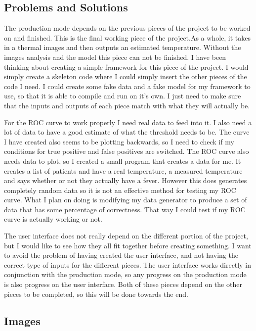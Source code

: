 \documentclass[onecolumn, draftclsnofoot,10pt, compsoc]{IEEEtran}
\begin{document}
\subsection{Problems and Solutions}
The production mode depends on the previous pieces of the project to be worked on and finished. This is the final working piece of the project.As a whole, it takes in a thermal images and then outputs an estimated temperature. Without the images analysis and the model this piece can not be finished. I have been thinking about creating a simple framework for this piece of the project. I would simply create a skeleton code where I could simply insert the other pieces of the code I need. I could create some fake data and a fake model for my framework to use, so that it is able to compile and run on it’s own. I just need to make sure that the inputs and outputs of each piece match with what they will actually be.

For the ROC curve to work properly I need real data to feed into it. I also need a lot of data to have a good estimate of what the threshold needs to be. The curve I have created also seems to be plotting backwards, so I need to check if my conditions for true positive and false positives are switched. The ROC curve also needs data to plot, so I created a small program that creates a data for me. It creates a list of patients and have a real temperature, a measured temperature and says whether or not they actually have a fever. However this does generates completely random data so it is not an effective method for testing my ROC curve. What I plan on doing is modifying my data generator to produce a set of data that has some percentage of correctness. That way I could test if my ROC curve is actually working or not.

The user interface does not really depend on the different portion of the project, but I would like to see how they all fit together before creating something. I want to avoid the problem of having created the user interface, and not having the correct type of inputs for the different pieces. The user interface works directly in conjunction with the production mode, so any progress on the production mode is also progress on the user interface. Both of these pieces depend on the other pieces to be completed, so this will be done towards the end.


\subsection{Images}







\end{document}
